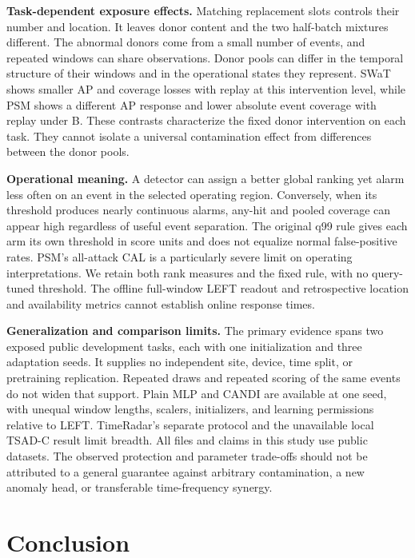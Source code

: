 \documentclass[
  american,
]{article}
\begin{document}
\textbf{Task-dependent exposure effects.} Matching replacement slots
controls their number and location. It leaves donor content and the two
half-batch mixtures different. The abnormal donors come from a small
number of events, and repeated windows can share observations. Donor
pools can differ in the temporal structure of their windows and in the
operational states they represent. SWaT shows smaller AP and coverage
losses with replay at this intervention level, while PSM shows a
different AP response and lower absolute event coverage with replay
under B. These contrasts characterize the fixed donor intervention on
each task. They cannot isolate a universal contamination effect from
differences between the donor pools.

\textbf{Operational meaning.} A detector can assign a better global
ranking yet alarm less often on an event in the selected operating
region. Conversely, when its threshold produces nearly continuous
alarms, any-hit and pooled coverage can appear high regardless of useful
event separation. The original q99 rule gives each arm its own threshold
in score units and does not equalize normal false-positive rates. PSM's
all-attack CAL is a particularly severe limit on operating
interpretations. We retain both rank measures and the fixed rule, with
no query-tuned threshold. The offline full-window LEFT readout and
retrospective location and availability metrics cannot establish online
response times.

\textbf{Generalization and comparison limits.} The primary evidence
spans two exposed public development tasks, each with one initialization
and three adaptation seeds. It supplies no independent site, device,
time split, or pretraining replication. Repeated draws and repeated
scoring of the same events do not widen that support. Plain MLP and
CANDI are available at one seed, with unequal window lengths, scalers,
initializers, and learning permissions relative to LEFT. TimeRadar's
separate protocol and the unavailable local TSAD-C result limit breadth.
All files and claims in this study use public datasets. The observed
protection and parameter trade-offs should not be attributed to a
general guarantee against arbitrary contamination, a new anomaly head,
or transferable time-frequency synergy.

\section{Conclusion}\label{conclusion}
\end{document}
